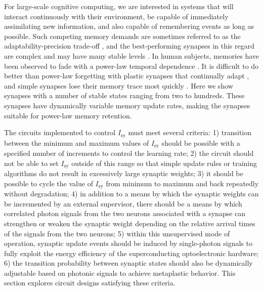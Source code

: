 \documentclass[twocolumn]{article}
\begin{document}
For large-scale cognitive computing, we are interested in systems that will interact continuously with their environment, be capable of immediately assimilating new information, and also capable of remembering events as long as possible. Such competing memory demands are sometimes referred to as the adaptability-precision trade-off \cite{khso2017}, and the best-performing synapses in this regard are complex \cite{fudr2005} and may have many stable levels \cite{fuab2007}. In human subjects, memories have been observed to fade with a power-law temporal dependence \cite{wieb1991,wieb1997}. It is difficult to do better than power-law forgetting with plastic synapses that continually adapt \cite{fudr2005}, and simple synapses lose their memory trace most quickly \cite{fuab2007}. Here we show synapses with a number of stable states ranging from two to hundreds. These synapses have dynamically variable memory update rates, making the synapses suitable for power-law memory retention.

The circuits implemented to control $I_{\mathrm{sy}}$ must meet several criteria: 1) transition between the minimum and maximum values of $I_{\mathrm{sy}}$ should be possible with a specified number of increments to control the learning rate; 2) the circuit should not be able to set $I_{\mathrm{sy}}$ outside of this range so that simple update rules or training algorithms do not result in excessively large synaptic weights; 3) it should be possible to cycle the value of $I_{\mathrm{sy}}$ from minimum to maximum and back repeatedly without degradation; 4) in addition to a means by which the synaptic weights can be incremented by an external supervisor, there should be a means by which correlated photon signals from the two neurons associated with a synapse can strengthen or weaken the synaptic weight depending on the relative arrival times of the signals from the two neurons; 5) within this unsupervised mode of operation, synaptic update events should be induced by single-photon signals to fully exploit the energy efficiency of the superconducting optoelectronic hardware; 6) the transition probability between synaptic states should also be dynamically adjustable based on photonic signals to achieve metaplastic behavior. This section explores circuit designs satisfying these criteria.
\end{document}
